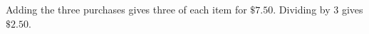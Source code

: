 Adding the three purchases gives three of each item for $\$7.50$. Dividing by 3 gives $\boxed{\$2.50}$.
